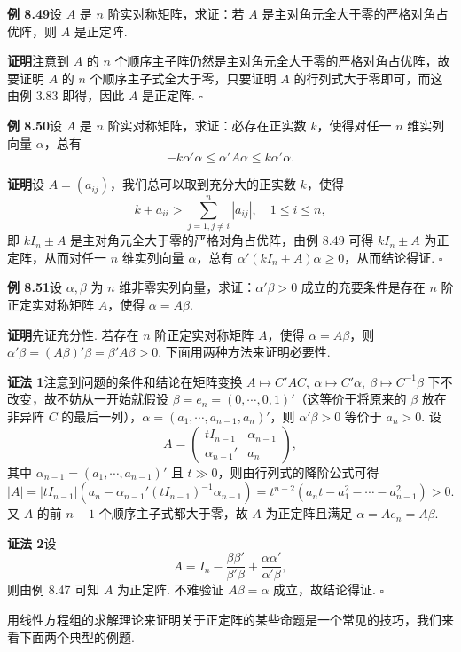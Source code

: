 \documentclass[UTF8, 12pt, fontset=fandol, oneside]{ctexart}
\begin{document}
\noindent\textbf{例 8.49}\quad 设 $A$ 是 $n$ 阶实对称矩阵，求证：若 $A$ 是主对角元全大于零的严格对角占优阵，则 $A$ 是正定阵.

\noindent\textbf{证明}\quad 注意到 $A$ 的 $n$ 个顺序主子阵仍然是主对角元全大于零的严格对角占优阵，故要证明 $A$ 的 $n$ 个顺序主子式全大于零，只要证明 $A$ 的行列式大于零即可，而这由例 3.83 即得，因此 $A$ 是正定阵. $\ensuremath{\square}$

\noindent\textbf{例 8.50}\quad 设 $A$ 是 $n$ 阶实对称矩阵，求证：必存在正实数 $k$，使得对任一 $n$ 维实列向量 $\alpha$，总有
\[
-k\alpha'\alpha\le \alpha'A\alpha\le k\alpha'\alpha.
\]

\noindent\textbf{证明}\quad 设 $A=(a_{ij})$，我们总可以取到充分大的正实数 $k$，使得
\[
k+a_{ii}>\sum_{j=1,j\ne i}^n |a_{ij}|,\quad 1\le i\le n,
\]
即 $kI_n\pm A$ 是主对角元全大于零的严格对角占优阵，由例 8.49 可得 $kI_n\pm A$ 为正定阵，从而对任一 $n$ 维实列向量 $\alpha$，总有 $\alpha'(kI_n\pm A)\alpha\ge 0$，从而结论得证. $\ensuremath{\square}$

\noindent\textbf{例 8.51}\quad 设 $\alpha,\beta$ 为 $n$ 维非零实列向量，求证：$\alpha'\beta>0$ 成立的充要条件是存在 $n$ 阶正定实对称矩阵 $A$，使得 $\alpha=A\beta$.

\noindent\textbf{证明}\quad 先证充分性. 若存在 $n$ 阶正定实对称矩阵 $A$，使得 $\alpha=A\beta$，则 $\alpha'\beta=(A\beta)'\beta=\beta'A\beta>0$. 下面用两种方法来证明必要性.

\noindent\textbf{证法 1}\quad 注意到问题的条件和结论在矩阵变换 $A\mapsto C'AC,\ \alpha\mapsto C'\alpha,\ \beta\mapsto C^{-1}\beta$ 下不改变，故不妨从一开始就假设 $\beta=e_n=(0,\cdots,0,1)'$（这等价于将原来的 $\beta$ 放在非异阵 $C$ 的最后一列），$\alpha=(a_1,\cdots,a_{n-1},a_n)'$，则 $\alpha'\beta>0$ 等价于 $a_n>0$. 设
\[
A=\left(\begin{array}{cc}
tI_{n-1} & \alpha_{n-1}\\
\alpha_{n-1}' & a_n
\end{array}\right),
\]
其中 $\alpha_{n-1}=(a_1,\cdots,a_{n-1})'$ 且 $t\gg 0$，则由行列式的降阶公式可得
\[
|A|=|tI_{n-1}|\left(a_n-\alpha_{n-1}'(tI_{n-1})^{-1}\alpha_{n-1}\right)
=t^{n-2}(a_nt-a_1^2-\cdots-a_{n-1}^2)>0.
\]
又 $A$ 的前 $n-1$ 个顺序主子式都大于零，故 $A$ 为正定阵且满足 $\alpha=Ae_n=A\beta$.

\noindent\textbf{证法 2}\quad 设
\[
A=I_n-\frac{\beta\beta'}{\beta'\beta}+\frac{\alpha\alpha'}{\alpha'\beta},
\]
则由例 8.47 可知 $A$ 为正定阵. 不难验证 $A\beta=\alpha$ 成立，故结论得证. $\ensuremath{\square}$

用线性方程组的求解理论来证明关于正定阵的某些命题是一个常见的技巧，我们来看下面两个典型的例题.
\end{document}
